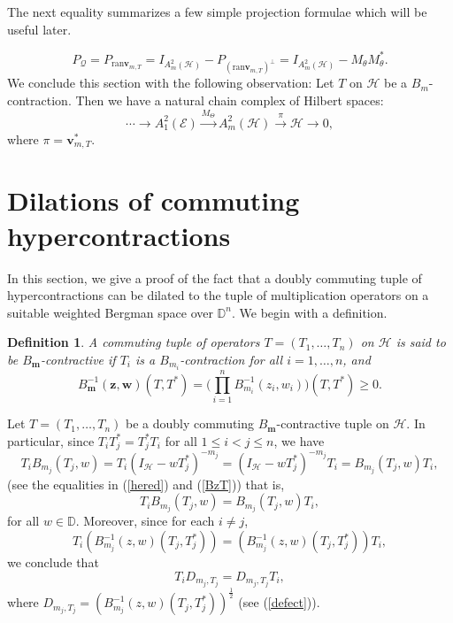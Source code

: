 \documentclass[12pt]{amsart}
\newtheorem{Definition}[Theorem]{\sc Definition}
\begin{document}
The next equality summarizes a few simple projection formulae which
will be useful later.

\begin{equation}\label{qtheta} P_{\mathcal{Q}} = P_{\mbox{ran} \bm{v}_{m, T}} = I_{A^2_m({\mathcal{H}})} -
P_{(\mbox{ran} \bm{v}_{m, T})^\perp} = I_{A^2_m({\mathcal{H}})} - M_{\theta}
M^*_{\theta}.\end{equation} We conclude this section with the
following observation: Let $T$ on ${\mathcal{H}}$ be a $B_m$-contraction.
Then we have a natural chain complex of Hilbert spaces:\[\cdots
\longrightarrow A^2_1({\mathcal{E}}) \stackrel{M_{\Theta}} \longrightarrow
A^2_m({\mathcal{H}}) \stackrel{\pi} \longrightarrow {\mathcal{H}} \longrightarrow
0,\]where $\pi = \bm{v}_{m,T}^*$.

{\setcounter{equation}{0} \section{{Dilations of commuting hypercontractions}}}

In this section, we give a proof of the fact that a doubly commuting
tuple of hypercontractions can be dilated to the tuple of
multiplication operators on a suitable weighted Bergman space over
${\mathbb{D}}^n$. We begin with a definition.

\begin{Definition}\label{Def1}
A commuting tuple of operators $T = (T_1, \ldots, T_n)$ on ${\mathcal{H}}$ is
said to be $B_{\bm{m}}$-contractive if $T_i$ is a $B_{m_i}$-contraction
for all $i = 1, \ldots, n$, and \[B_{\bm{m}}^{-1}({\bm{z}}, {\bm{w}}) (T, T^*) =
\Big( \prod_{i=1}^n B_{m_i}^{-1}(z_i, w_i) \Big)(T, T^*) \geq 0.\]
\end{Definition}

Let $T = (T_1, \ldots, T_n)$ be a doubly commuting
$B_{\bm{m}}$-contractive tuple on ${\mathcal{H}}$. In particular, since $T_i
T_j^* = T_j^* T_i$ for all $1 \leq i < j \leq n$, we have
\[T_i B_{m_j}(T_j, w) = T_i (I_{\mathcal{H}} - w T_j^*)^{-m_j} = (I_{\mathcal{H}} - w
T_j^*)^{-m_j} T_i = B_{m_j}(T_j, w) T_i, \] (see the equalities in
(\ref{hered}) and (\ref{BzT})) that is,
\begin{equation}\label{T1}T_i B_{m_j}(T_j, w) = B_{m_j}(T_j, w)
T_i,\end{equation} for all $w \in {\mathbb{D}}$. Moreover, since for each $i
\neq j$,
\[T_i (B^{-1}_{m_j}(z, w)(T_j, T_j^*)) = (B^{-1}_{m_j}(z, w)(T_j, T_j^*)) T_i,\]we
conclude that \begin{equation}\label{T2}T_i D_{m_j, T_j} = D_{m_j,
T_j} T_i,\end{equation}where $D_{m_j, T_j} = (B_{m_j}^{-1}(z,
w)(T_j, T_j^*))^{\frac{1}{2}}$ (see (\ref{defect})).
\end{document}
